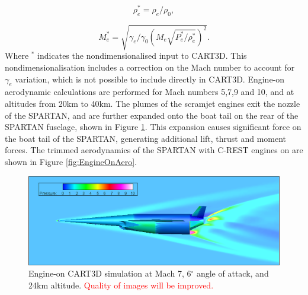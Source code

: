 		\begin{equation}
		\rho_e^* = \rho_e/\rho_0,
		\end{equation}
		
		\begin{equation}
		M_e^* = \sqrt{\gamma_e/\gamma_0 (M_e \sqrt{ P_e^*/\rho_e^*})^2}.
		\end{equation}
		Where $^*$ indicates the nondimensionalised input to CART3D. This nondimensionalisation includes a correction on the Mach number to account for $\gamma_e$ variation, which is not possible to include directly in CART3D\cite{Mehta2016}. Engine-on aerodynamic calculations are performed for Mach numbers 5,7,9 and 10, and at altitudes from 20km to 40km.
		The plumes of the scramjet engines exit the nozzle of the SPARTAN, and are further expanded onto the boat tail on the rear of the SPARTAN fuselage, shown in Figure \ref{fig:EngineOn-M7AoA624km}. This expansion causes significant force on the boat tail of the SPARTAN, generating additional lift, thrust and moment forces. The trimmed aerodynamics of the SPARTAN with C-REST engines on are shown in Figure \ref{fig:EngineOnAero}.
		
		
		\begin{figure}[ht]
			\centering
			\includegraphics[width=0.9\linewidth]{figures/3_vehicle_design/EngineOn-M7AoA024km}
			\caption{Engine-on CART3D simulation at Mach 7, 6$^\circ$ angle of attack, and 24km altitude. \textcolor{red}{Quality of images will be improved.}}
			\label{fig:EngineOn-M7AoA624km}
		\end{figure}
		
